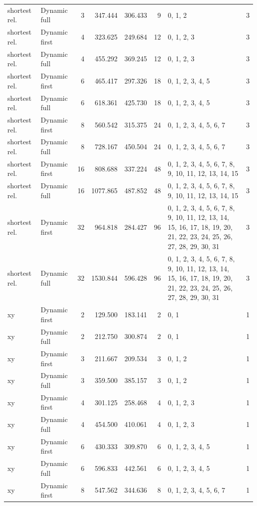 \documentclass[10pt,a4paper]{article}
\begin{document}
\begin{longtable}{@{}p{23mm}p{29mm}rrrrp{36mm}r@{}}
shortest rel. & Dynamic full & 3 & 347.444 & 306.433 & 9 & 0, 1, 2 & 3 \\
shortest rel. & Dynamic first & 4 & 323.625 & 249.684 & 12 & 0, 1, 2, 3 & 3 \\
shortest rel. & Dynamic full & 4 & 455.292 & 369.245 & 12 & 0, 1, 2, 3 & 3 \\
shortest rel. & Dynamic first & 6 & 465.417 & 297.326 & 18 & 0, 1, 2, 3, 4, 5 & 3 \\
shortest rel. & Dynamic full & 6 & 618.361 & 425.730 & 18 & 0, 1, 2, 3, 4, 5 & 3 \\
shortest rel. & Dynamic first & 8 & 560.542 & 315.375 & 24 & 0, 1, 2, 3, 4, 5, 6, 7 & 3 \\
shortest rel. & Dynamic full & 8 & 728.167 & 450.504 & 24 & 0, 1, 2, 3, 4, 5, 6, 7 & 3 \\
shortest rel. & Dynamic first & 16 & 808.688 & 337.224 & 48 & 0, 1, 2, 3, 4, 5, 6, 7, 8, 9, 10, 11, 12, 13, 14, 15 & 3 \\
shortest rel. & Dynamic full & 16 & 1077.865 & 487.852 & 48 & 0, 1, 2, 3, 4, 5, 6, 7, 8, 9, 10, 11, 12, 13, 14, 15 & 3 \\
shortest rel. & Dynamic first & 32 & 964.818 & 284.427 & 96 & 0, 1, 2, 3, 4, 5, 6, 7, 8, 9, 10, 11, 12, 13, 14, 15, 16, 17, 18, 19, 20, 21, 22, 23, 24, 25, 26, 27, 28, 29, 30, 31 & 3 \\
shortest rel. & Dynamic full & 32 & 1530.844 & 596.428 & 96 & 0, 1, 2, 3, 4, 5, 6, 7, 8, 9, 10, 11, 12, 13, 14, 15, 16, 17, 18, 19, 20, 21, 22, 23, 24, 25, 26, 27, 28, 29, 30, 31 & 3 \\
xy & Dynamic first & 2 & 129.500 & 183.141 & 2 & 0, 1 & 1 \\
xy & Dynamic full & 2 & 212.750 & 300.874 & 2 & 0, 1 & 1 \\
xy & Dynamic first & 3 & 211.667 & 209.534 & 3 & 0, 1, 2 & 1 \\
xy & Dynamic full & 3 & 359.500 & 385.157 & 3 & 0, 1, 2 & 1 \\
xy & Dynamic first & 4 & 301.125 & 258.468 & 4 & 0, 1, 2, 3 & 1 \\
xy & Dynamic full & 4 & 454.500 & 410.061 & 4 & 0, 1, 2, 3 & 1 \\
xy & Dynamic first & 6 & 430.333 & 309.870 & 6 & 0, 1, 2, 3, 4, 5 & 1 \\
xy & Dynamic full & 6 & 596.833 & 442.561 & 6 & 0, 1, 2, 3, 4, 5 & 1 \\
xy & Dynamic first & 8 & 547.562 & 344.636 & 8 & 0, 1, 2, 3, 4, 5, 6, 7 & 1 \\

\end{longtable}
\end{document}
